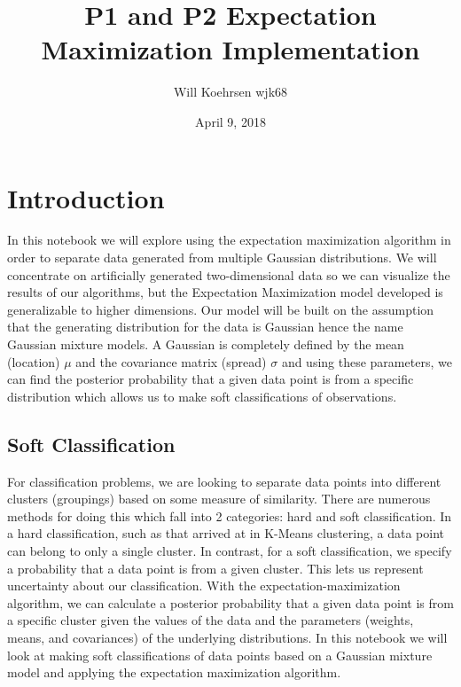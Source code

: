 \documentclass[12pt]{article}
\title{P1 and P2 Expectation Maximization Implementation}
\author{Will Koehrsen wjk68}
\date{April 9, 2018}
\begin{document}
    
    
    \maketitle
    \tableofcontents
   
\hypertarget{introduction}{%
\section{Introduction}\label{introduction}}

In this notebook we will explore using the expectation maximization
algorithm in order to separate data generated from multiple Gaussian
distributions. We will concentrate on artificially generated
two-dimensional data so we can visualize the results of our algorithms,
but the Expectation Maximization model developed is generalizable to
higher dimensions. Our model will be built on the assumption that the
generating distribution for the data is Gaussian hence the name Gaussian
mixture models. A Gaussian is completely defined by the mean (location)
\(\mu\) and the covariance matrix (spread) \(\sigma\) and using these
parameters, we can find the posterior probability that a given data
point is from a specific distribution which allows us to make soft
classifications of observations.

\hypertarget{soft-classification}{%
\subsection{Soft Classification}\label{soft-classification}}

For classification problems, we are looking to separate data points into
different clusters (groupings) based on some measure of similarity.
There are numerous methods for doing this which fall into 2 categories:
hard and soft classification. In a hard classification, such as that
arrived at in K-Means clustering, a data point can belong to only a
single cluster. In contrast, for a soft classification, we specify a
probability that a data point is from a given cluster. This lets us
represent uncertainty about our classification. With the
expectation-maximization algorithm, we can calculate a posterior
probability that a given data point is from a specific cluster given the
values of the data and the parameters (weights, means, and covariances)
of the underlying distributions. In this notebook we will look at making
soft classifications of data points based on a Gaussian mixture model
and applying the expectation maximization algorithm.
\end{document}
